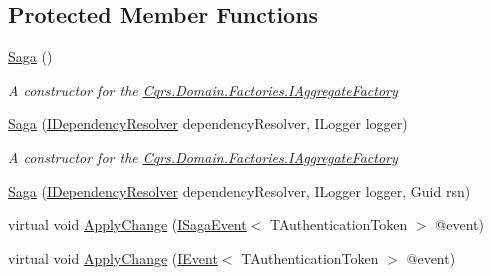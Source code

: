 \subsection*{Protected Member Functions}
\begin{DoxyCompactItemize}
\item 
\hyperlink{classCqrs_1_1Domain_1_1Saga_a1b6019cecbbf2572b64dd456cb5d91a2_a1b6019cecbbf2572b64dd456cb5d91a2}{Saga} ()
\begin{DoxyCompactList}\small\item\em A constructor for the \hyperlink{interfaceCqrs_1_1Domain_1_1Factories_1_1IAggregateFactory}{Cqrs.\+Domain.\+Factories.\+I\+Aggregate\+Factory} \end{DoxyCompactList}\item 
\hyperlink{classCqrs_1_1Domain_1_1Saga_affa39972d1946ab9f5d2474b17acbdd4_affa39972d1946ab9f5d2474b17acbdd4}{Saga} (\hyperlink{interfaceCqrs_1_1Configuration_1_1IDependencyResolver}{I\+Dependency\+Resolver} dependency\+Resolver, I\+Logger logger)
\begin{DoxyCompactList}\small\item\em A constructor for the \hyperlink{interfaceCqrs_1_1Domain_1_1Factories_1_1IAggregateFactory}{Cqrs.\+Domain.\+Factories.\+I\+Aggregate\+Factory} \end{DoxyCompactList}\item 
\hyperlink{classCqrs_1_1Domain_1_1Saga_acba7142c5e3ad568a60dc365fb7e8733_acba7142c5e3ad568a60dc365fb7e8733}{Saga} (\hyperlink{interfaceCqrs_1_1Configuration_1_1IDependencyResolver}{I\+Dependency\+Resolver} dependency\+Resolver, I\+Logger logger, Guid rsn)
\item 
virtual void \hyperlink{classCqrs_1_1Domain_1_1Saga_af8a1eddbadc8fc3fb69f18691f3b08ac_af8a1eddbadc8fc3fb69f18691f3b08ac}{Apply\+Change} (\hyperlink{interfaceCqrs_1_1Events_1_1ISagaEvent}{I\+Saga\+Event}$<$ T\+Authentication\+Token $>$ @event)
\item 
virtual void \hyperlink{classCqrs_1_1Domain_1_1Saga_a25462563492d834e297388e0648a57ac_a25462563492d834e297388e0648a57ac}{Apply\+Change} (\hyperlink{interfaceCqrs_1_1Events_1_1IEvent}{I\+Event}$<$ T\+Authentication\+Token $>$ @event)
\end{DoxyCompactItemize}

